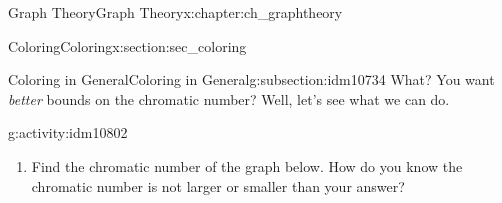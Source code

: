 \documentclass[oneside,10pt,]{book}
\numberwithin{equation}{chapter}
\begin{document}
\begin{chapterptx}{Graph Theory}{}{Graph Theory}{}{}{x:chapter:ch_graphtheory}
\begin{sectionptx}{Coloring}{}{Coloring}{}{}{x:section:sec_coloring}
\begin{subsectionptx}{Coloring in General}{}{Coloring in General}{}{}{g:subsection:idm10734}
What? You want \emph{better} bounds on the chromatic number? Well, let's see what we can do.%
\begin{activity}{}{g:activity:idm10802}%
\begin{enumerate}[font=\bfseries,label=(\alph*),ref=\alph*]
\item{}Find the chromatic number of the graph below.  How do you know the chromatic number is not larger or smaller than your answer?%
\begin{sidebyside}{1}{0.375}{0.375}{0}%
\begin{sbspanel}{0.25}%
\end{sbspanel}
\end{sidebyside}
\end{enumerate}
\end{activity}
\end{subsectionptx}
\end{sectionptx}
\end{chapterptx}
\end{document}
